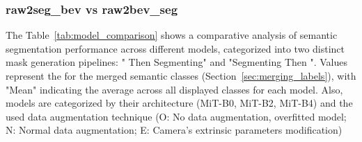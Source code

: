 \subsubsection{raw2seg\_bev vs raw2bev\_seg}
The Table~\ref{tab:model_comparison} shows a comparative analysis of semantic segmentation performance across different models, categorized into two distinct  mask generation pipelines: " Then Segmenting" and "Segmenting Then ". Values represent the  for the merged semantic classes (Section~\ref{sec:merging_labels}), with "Mean" indicating the average  across all displayed classes for each model. Also, models are categorized by their architecture (MiT-B0, MiT-B2, MiT-B4) and the used data augmentation technique (O: No data augmentation, overfitted model; N: Normal data augmentation; E: Camera's extrinsic parameters modification)

